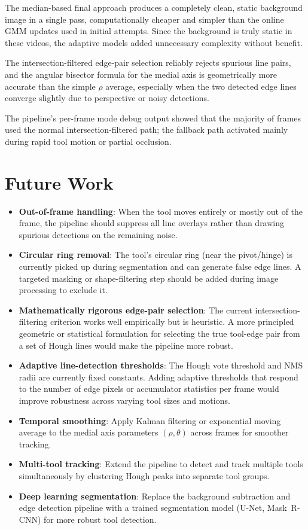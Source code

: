 \documentclass[conference, twocolumn]{IEEEtran}
\begin{document}
The median-based final approach produces a completely clean, static background image in a single pass, computationally cheaper and simpler than the online GMM updates used in initial attempts. Since the background is truly static in these videos, the adaptive models added unnecessary complexity without benefit.

The intersection-filtered edge-pair selection reliably rejects spurious line pairs, and the angular bisector formula for the medial axis is geometrically more accurate than the simple $\rho$ average, especially when the two detected edge lines converge slightly due to perspective or noisy detections.

The pipeline's per-frame mode debug output showed that the majority of frames used the normal intersection-filtered path; the fallback path activated mainly during rapid tool motion or partial occlusion.

\section{Future Work}

\begin{itemize}
    \item \textbf{Out-of-frame handling}: When the tool moves entirely or mostly out of the frame, the pipeline should suppress all line overlays rather than drawing spurious detections on the remaining noise.
    \item \textbf{Circular ring removal}: The tool's circular ring (near the pivot/hinge) is currently picked up during segmentation and can generate false edge lines. A targeted masking or shape-filtering step should be added during image processing to exclude it.
    \item \textbf{Mathematically rigorous edge-pair selection}: The current intersection-filtering criterion works well empirically but is heuristic. A more principled geometric or statistical formulation for selecting the true tool-edge pair from a set of Hough lines would make the pipeline more robust.
    \item \textbf{Adaptive line-detection thresholds}: The Hough vote threshold and NMS radii are currently fixed constants. Adding adaptive thresholds that respond to the number of edge pixels or accumulator statistics per frame would improve robustness across varying tool sizes and motions.
    \item \textbf{Temporal smoothing}: Apply Kalman filtering or exponential moving average to the medial axis parameters $(\rho, \theta)$ across frames for smoother tracking.
    \item \textbf{Multi-tool tracking}: Extend the pipeline to detect and track multiple tools simultaneously by clustering Hough peaks into separate tool groups.
    \item \textbf{Deep learning segmentation}: Replace the background subtraction and edge detection pipeline with a trained segmentation model (U-Net, Mask~R-CNN) for more robust tool detection.
\end{itemize}
\end{document}

